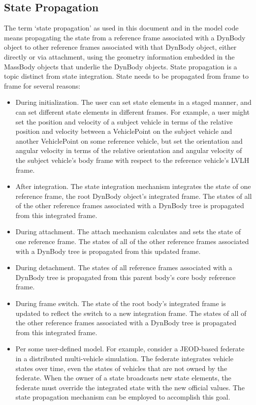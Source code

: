 \subsection{State Propagation}\label{sec:detailed_state_prop}
The term `state propagation' as used in this document and in the model code
means propagating the state from a reference frame associated with a DynBody
object to other reference frames associated with that DynBody object, either
directly or via attachment, using the geometry information embedded in the
MassBody objects that underlie the DynBody objects. State propagation is a
topic distinct from state integration. State needs to be propagated from frame
to frame for several reasons:
\begin{itemize}
\item During initialization. The user can set state elements in a staged manner,
and can set different state elements in different frames. For example, a user
might set the position and velocity of a subject vehicle in terms of the
relative position and velocity between a VehiclePoint on the subject vehicle and
another VehiclePoint on some reference vehicle, but set the orientation and
angular velocity in terms of the relative orientation and angular velocity
of the subject vehicle's body frame with respect to the reference vehicle's
LVLH frame.
\item After integration. The state integration mechanism integrates the state
of one reference frame, the root DynBody object's integrated frame. The states
of all of the other reference frames associated with a DynBody tree is propagated from this integrated frame.
\item During attachment. The attach mechanism calculates and sets the state of
one reference frame. The states of all of the other reference frames associated
with a DynBody tree is propagated from this updated frame.
\item During detachment. The states of all reference frames associated with a
DynBody tree is propagated from this parent body's core body reference frame.
\item During frame switch. The state of the root body's integrated frame is
updated to reflect the switch to a new integration frame. The states
of all of the other reference frames associated with a DynBody tree is propagated from this integrated frame.
\item Per some user-defined model. For example, consider a JEOD-based federate
in a distributed multi-vehicle simulation. The federate integrates vehicle
states over time, even the states of vehicles that are not owned by the
federate. When the owner of a state broadcasts new state elements, the federate
must override the integrated state with the new official values. The state
propagation mechanism can be employed to accomplish this goal.
\end{itemize}

